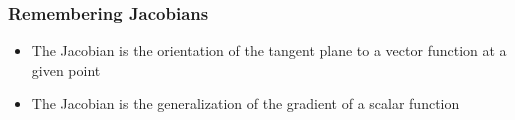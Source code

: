 \begin{frame}
    \frametitle{Remembering Jacobians}
    
    \begin{itemize}
        \item The Jacobian is the orientation of the tangent plane to a vector function at a given point
        \item The Jacobian is the generalization of the gradient of a scalar function
    \end{itemize}
    
    \begin{figure}[!h]
    \centering
    \hspace{1cm} 
    \end{figure}
    
    \begin{center}
    \end{center}
    
    
    \end{frame}
    
